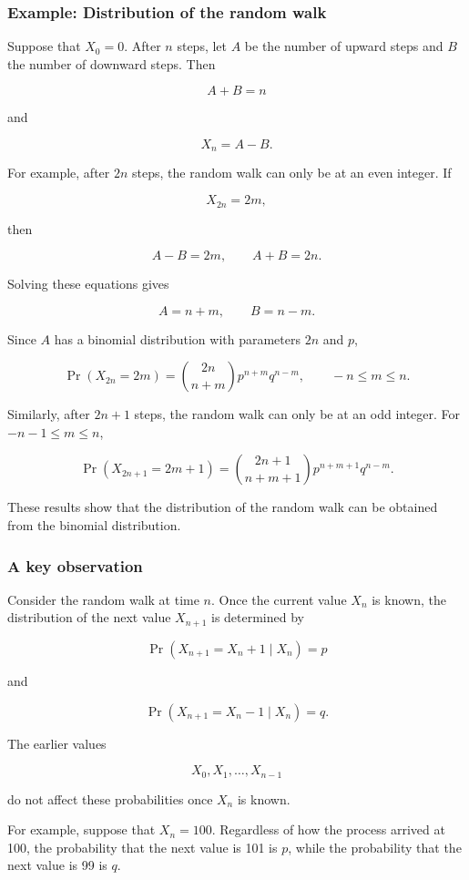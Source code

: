 \documentclass[
  letterpaper,
  DIV=11,
  numbers=noendperiod]{scrartcl}
\theoremstyle{definition}
\theoremstyle{remark}
\begin{document}
\subsubsection{Example: Distribution of the random
walk}\label{example-distribution-of-the-random-walk}

Suppose that \(X_0=0\). After \(n\) steps, let \(A\) be the number of
upward steps and \(B\) the number of downward steps. Then

\[
A+B=n
\]

and

\[
X_n=A-B.
\]

For example, after \(2n\) steps, the random walk can only be at an even
integer. If

\[
X_{2n}=2m,
\]

then

\[
A-B=2m,
\qquad
A+B=2n.
\]

Solving these equations gives

\[
A=n+m,
\qquad
B=n-m.
\]

Since \(A\) has a binomial distribution with parameters \(2n\) and
\(p\),

\[
\Pr(X_{2n}=2m)
={2n\choose n+m}p^{n+m}q^{n-m},
\qquad -n\leq m\leq n.
\]

Similarly, after \(2n+1\) steps, the random walk can only be at an odd
integer. For \(-n-1\leq m\leq n\),

\[
\Pr(X_{2n+1}=2m+1)
={2n+1\choose n+m+1}
p^{n+m+1}q^{n-m}.
\]

These results show that the distribution of the random walk can be
obtained from the binomial distribution.

\subsubsection{A key observation}\label{a-key-observation}

Consider the random walk at time \(n\). Once the current value \(X_n\)
is known, the distribution of the next value \(X_{n+1}\) is determined
by

\[
\Pr(X_{n+1}=X_n+1\mid X_n)=p
\]

and

\[
\Pr(X_{n+1}=X_n-1\mid X_n)=q.
\]

The earlier values

\[
X_0,X_1,\ldots,X_{n-1}
\]

do not affect these probabilities once \(X_n\) is known.

For example, suppose that \(X_n=100\). Regardless of how the process
arrived at 100, the probability that the next value is 101 is \(p\),
while the probability that the next value is 99 is \(q\).
\end{document}
